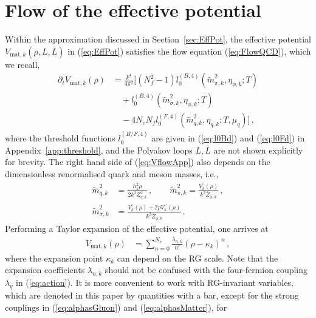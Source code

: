 \documentclass[%
reprint,
superscriptaddress,
showpacs,preprintnumbers,
 amsmath,amssymb,
 aps,
prd,
]{revtex4-1}
\def\eq#1{(\ref{#1})}
\def\sec#1{Section~\ref{#1}}
\def\app#1{Appendix~\ref{#1}}
\begin{document}

\section{Flow of the effective potential}
\label{app:flowV}

Within the approximation discussed in \sec{sec:EffPot}, the effective
potential $V_{\mathrm{mat}, k}(\rho, L,\bar L)$ in \eq{eq:EffPot}
satisfies the flow equation \eq{eq:FlowQCD}, which we recall,
%
\begin{align}
  \partial_{t}V_{\mathrm{mat}, k}(\rho)
  &=\frac{k^{4}}{4\pi^{2}}\big[(N_{f}^{2}-1)
    l_{0}^{(B,4)}(\tilde{m}_{\pi,k}^{2},\eta_{\phi,k};T)
    \nonumber \\[1ex]
  &\quad+l_{0}^{(B,4)}(\tilde{m}_{\sigma,k}^{2},
    \eta_{\phi,k};T)\nonumber\\[1ex]
  &\quad-4N_{c}N_{f}l_{0}^{(F,4)}(\tilde{m}_{q,k}^{2},
    \eta_{q,k};T,\mu_q)\big]\,,\label{eq:VflowApp}
\end{align}
%
where the threshold functions $l_{0}^{(B/F,4)}$ are given in
\eq{eq:l0Bd} and \eq{eq:l0Fd} in \app{app:threshold}, and the Polyakov
loops $L,\bar L$ are not shown explicitly for brevity. The right hand
side of \eq{eq:VflowApp} also depends on the dimensionless
renormalised quark and meson masses, i.e.,
% 
\begin{align}\nonumber 
  \tilde{m}_{q,k}^{2}
  &=\frac{h_{k}^{2}\rho}{2k^{2} Z_{q,k}^{2}}\,,
    \quad \quad\tilde{m}_{\pi,k}^{2}=
    \frac{V_{k}^{\prime}(\rho)}{k^{2} \bar Z_{\phi,k}}\,,
  \\[1ex]
  \tilde{m}_{\sigma,k}^{2}
  &=\frac{V_{k}^{\prime}(\rho)+2\rho 
    V_{k}^{\prime\prime}(\rho)}{k^{2}\bar Z_{\phi,k}}\,.
                          \label{eq:DimlessMass} 
\end{align}
%
Performing a Taylor expansion of the effective potential, one arrives
at
\begin{align}
  V_{\mathrm{mat}, k}(\rho)
  &=\sum_{n=0}^{N_v}\frac{\lambda_{n,k}}{n!}(\rho
    -\kappa_k)^n\,, \label{eq:VTaylor}
\end{align}
where the expansion point $\kappa_k$ can depend on the RG scale. Note
that the expansion coefficients $\lambda_{n,k}$ should not be confused
with the four-fermion coupling $\lambda_{q}$ in \eq{eq:action}. It is
more convenient to work with RG-invariant variables, which are denoted
in this paper by quantities with a bar, except for the strong
couplings in \eq{eq:alphasGluon} and \eq{eq:alphasMatter}, for
\end{document}
